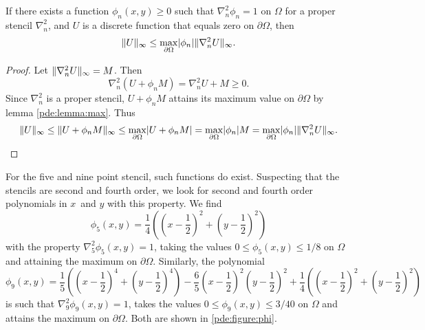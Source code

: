 \begin{lemma}\label{pde:lemma:bound}
  If there exists a function $\phi_n(x,y) \geq 0$ such that $\nabla_n^2 \phi_n = 1$ on $\Omega$ for a proper stencil $\nabla_n^2$, and $U$ is a discrete function that equals zero on $\partial \Omega$, then
  \begin{equation}
    \lVert U \rVert_\infty \leq \max_{\partial\Omega} \lvert \phi_n \rvert
    \lVert \nabla_n^2 U \rVert_\infty.
  \end{equation}
\end{lemma}
\begin{proof}
Let $\lVert \nabla_n^2 U \rVert_\infty = M$.
Then
$$
\nabla_n^2 (U + \phi_n M) = \nabla_n^2 U +  M \geq 0.
$$
Since $\nabla_n^2$ is a proper stencil, $U + \phi_n M$ attains its maximum value on $\partial \Omega$ by lemma \ref{pde:lemma:max}.
Thus
\begin{equation*}
\lVert U \rVert_\infty
\leq \lVert U + \phi_n M \rVert_\infty
\leq \max_{\partial \Omega} \lvert U + \phi_n M\rvert
= \max_{\partial\Omega} \lvert \phi_n \rvert M
= \max_{\partial\Omega} \lvert \phi_n \rvert \lVert \nabla_n^2 U \rVert_\infty. \qedhere
\end{equation*}
\end{proof}

\begin{remark}
  For the five and nine point stencil, such functions do exist.
  Suspecting that the stencils are second and fourth order, we look for second and fourth order polynomials in $x$ and $y$ with this property.
  We find 
  \begin{equation}
    \phi_5(x,y) = \frac14 \left(\left(x-\frac12\right)^2 + \left(y-\frac12\right)^2\right)
    \label{pde:equation:phi5}
  \end{equation}
  with the property $\nabla_5^2 \phi_5(x,y) = 1$, taking the values $0 \leq \phi_5(x,y) \leq 1/8$ on $\Omega$ and attaining the maximum on $\partial \Omega$.
  \newcommand{\phinine}{\frac{1}{5} \left(\left(x-\frac{1}{2}\right)^4+\left(y-\frac{1}{2}\right)^4\right) - \frac{6}{5} \left(x-\frac{1}{2}\right)^2\left(y-\frac{1}{2}\right)^2 + \frac{1}{4} \left(\left(x-\frac{1}{2}\right)^2+\left(y-\frac{1}{2}\right)^2\right)}
  Similarly, the polynomial
  \begin{equation}
  \phi_9(x,y) = \phinine
  \label{pde:equation:phi9}
  \end{equation}
  is such that $\nabla_9^2 \phi_9(x,y) = 1$, takes the values $0 \leq \phi_9(x,y) \leq 3/40$ on $\Omega$ and attains the maximum on $\partial \Omega$.
  Both are shown in \cref{pde:figure:phi}.
\end{remark}

